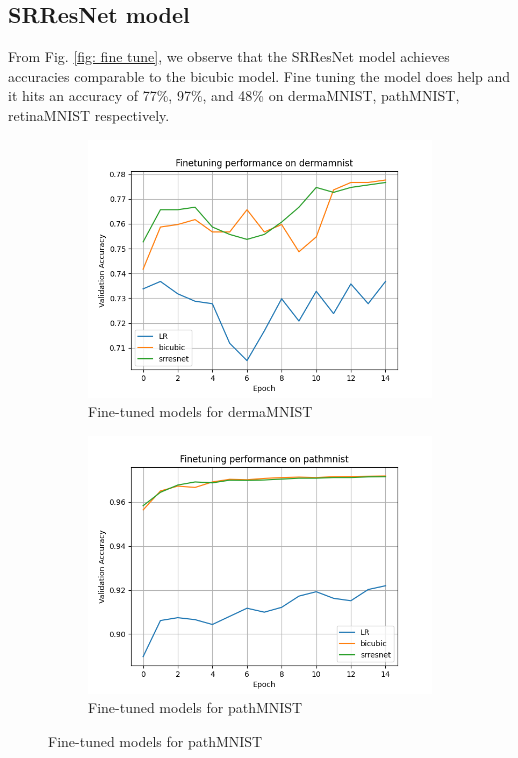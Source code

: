 \documentclass[10pt,twocolumn,letterpaper]{article}
\begin{document}
\subsection{SRResNet model}
From Fig. \ref{fig: fine tune}, we observe that the SRResNet model achieves accuracies comparable to the bicubic model. Fine tuning the model does help and it hits an accuracy of 77\%, 97\%, and 48\% on dermaMNIST, pathMNIST, retinaMNIST respectively.

\begin{figure}
    \centering
    \begin{subfigure}{0.3\textwidth}
        \includegraphics[width=\linewidth]{Code/plots/finetune_dermamnist.png}
        \caption{Fine-tuned models for dermaMNIST}
        \label{fig:fine tune derma}
    \end{subfigure}
    
    \begin{subfigure}{0.3\textwidth}
        \includegraphics[width=\linewidth]{Code/plots/finetune_pathmnist.png}
        \caption{Fine-tuned models for pathMNIST}
        \label{fig:fine tune path}
    \end{subfigure}


\end{figure}
\end{document}
